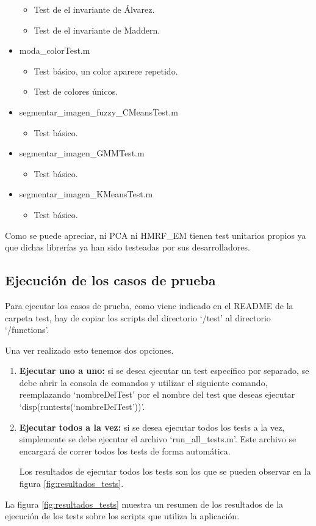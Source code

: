 \begin{itemize}
    \begin{itemize}
        \item Test de el invariante de Álvarez.
        \item Test de el invariante de Maddern.
    \end{itemize}
    \item moda\_colorTest.m
    \begin{itemize}
        \item Test básico, un color aparece repetido.
        \item Test de colores únicos.
    \end{itemize}
    \item segmentar\_imagen\_fuzzy\_CMeansTest.m
    \begin{itemize}
        \item Test básico.
    \end{itemize}
    \item segmentar\_imagen\_GMMTest.m
    \begin{itemize}
        \item Test básico.
    \end{itemize}
    \item segmentar\_imagen\_KMeansTest.m
    \begin{itemize}
        \item Test básico.
    \end{itemize}
\end{itemize}

Como se puede apreciar, ni PCA ni HMRF\_EM tienen test unitarios propios ya que dichas librerías ya han sido testeadas por sus desarrolladores.

\subsection{Ejecución de los casos de prueba}\label{ejecución-de-los-casos-de-prueba}

Para ejecutar los casos de prueba, como viene indicado en el README de la carpeta test, hay de copiar los scripts del directorio `/test' al directorio `/functions'.

Una ver realizado esto tenemos dos opciones.
\begin{enumerate}
    \item \textbf{Ejecutar uno a uno:} si se desea ejecutar un test específico por separado, se debe abrir la consola de comandos y utilizar el siguiente comando, reemplazando `nombreDelTest' por el nombre del test que deseas ejecutar `disp(runtests(`nombreDelTest'))'.
    \item \textbf{Ejecutar todos a la vez:} si se desea ejecutar todos los tests a la vez, simplemente se debe ejecutar el archivo `run\_all\_tests.m'. Este archivo se encargará de correr todos los tests de forma automática.
    
    Los resultados de ejecutar todos los tests son los que se pueden observar en la figura \ref{fig:resultados_tests}.
\end{enumerate}


La figura \ref{fig:resultados_tests} muestra un resumen de los resultados de la ejecución de los tests sobre los scripts que utiliza la aplicación.